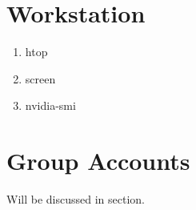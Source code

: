 \section{Workstation}
\begin{enumerate}
	\item htop
	\item screen
	\item nvidia-smi
\end{enumerate}

\section{Group Accounts}
Will be discussed in section.